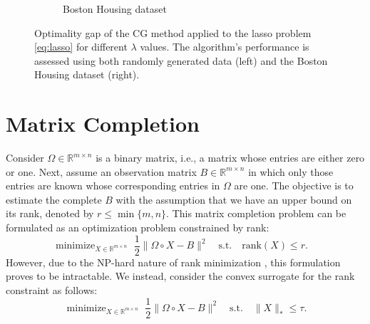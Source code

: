 \documentclass[10pt, twocolumn, reqno, a4paper,oneside]{amsart}
\numberwithin{equation}{section}
\numberwithin{theorem}{section}
\numberwithin{figure}{section}
\numberwithin{table}{section}
\numberwithin{theorem}{section}
\numberwithin{equation}{section}
\DeclareMathOperator*{\minimize}{minimize}
\begin{document}
\begin{figure}[!tb]
\begin{subfigure}[b]{0.42\textwidth}
		\caption{Boston Housing dataset}
		\label{fig:bhousing}
	\end{subfigure}
	\caption{Optimality gap of the CG method applied to the lasso problem \eqref{eq:lasso} for different $\lambda$ values. The algorithm's performance is assessed using both randomly generated data (left) and the Boston Housing dataset (right).}
	\label{fig:lasso}
\end{figure}


\section{Matrix Completion} \label{sec:MC}


Consider $\Omega \in \mathbb{R}^{m \times n}$ is a binary matrix, i.e., a matrix whose entries are either zero or one.
Next, assume an observation matrix $B \in \mathbb{R}^{m \times n}$ in which only those entries are known whose corresponding entries in $\Omega$ are one.
The objective is to estimate the complete $B$ with the assumption that we have an upper bound on its rank, denoted by $r \leq \min\{m,n\}$. This matrix completion problem can be formulated as an optimization problem constrained by rank:
\begin{equation} \label{eq:rank}
	\minimize_{X \in \mathbb{R}^{m \times n}}\,\, \frac{1}{2} \| \Omega \circ X - B \|^2 \quad \text{s.t.} \quad \text{rank}(X) \leq r. \quad\end{equation}
However, due to the NP-hard nature of rank minimization \cite{8265431}, this formulation proves to be intractable. We instead, consider the convex surrogate for the rank constraint \cite{945730} as follows:
\begin{equation} \label{eq:nucnorm}
	\minimize_{X \in \mathbb{R}^{m \times n}}\,\, \frac{1}{2}\| \Omega\circ X - B \|^2 \quad \text{s.t.} \quad \|X\|_* \leq \tau.
\end{equation}
\end{document}
